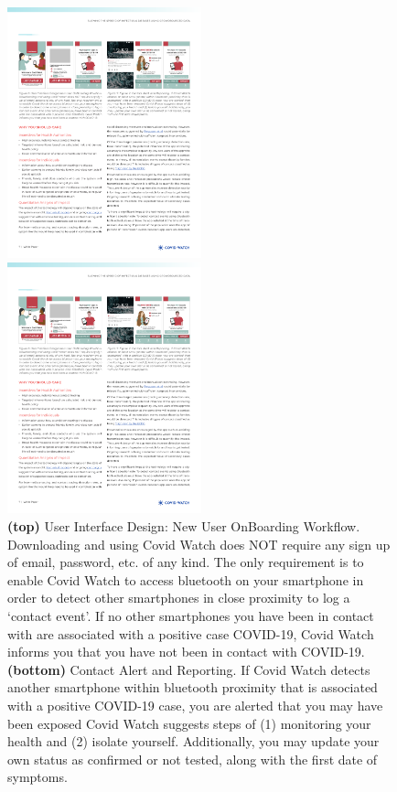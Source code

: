 \documentclass[11pt]{article}
\begin{document}
\begin{figure}[h]
\centering
\includegraphics[width=0.5\textwidth]{figs/fig5.pdf} 


\includegraphics[width=0.5\textwidth]{figs/fig6.pdf}
\caption{\textbf{(top)} User Interface Design: New User OnBoarding Workflow. Downloading and using Covid Watch does NOT require any sign up of email, password, etc. of any kind. The only requirement is to enable Covid Watch to access bluetooth on your smartphone in order to detect other smartphones in close proximity to log a ‘contact event’. If no other smartphones you have been in contact with are associated with a positive case COVID-19, Covid Watch informs you that you have not been in contact with COVID-19.
\textbf{(bottom)} Contact Alert and Reporting. If Covid Watch detects another smartphone within bluetooth proximity that is associated with a positive COVID-19 case, you are alerted that you may have been exposed Covid Watch suggests steps of (1) monitoring your health and (2) isolate yourself. Additionally, you may update your own status as confirmed or not tested, along with the first date of symptoms.}
\end{figure}
\end{document}
